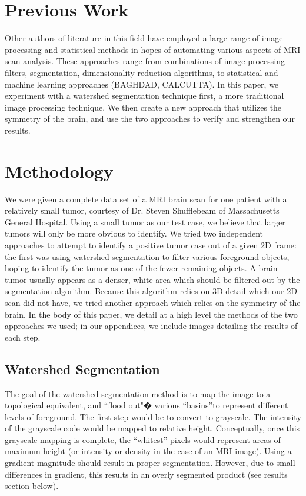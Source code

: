 \documentclass[12pt]{article}
\theoremstyle{plain}%
\theoremstyle{definition}
\theoremstyle{remark}
\begin{document}
\section{Previous Work}
Other authors of literature in this field have employed a large range of image processing and statistical methods in hopes of automating various aspects of MRI scan analysis. These approaches range from combinations of image processing filters, segmentation, dimensionality reduction algorithms, to statistical and machine learning approaches (BAGHDAD, CALCUTTA). In this paper, we experiment with a watershed segmentation technique first, a more traditional image processing technique. We then create a new approach that utilizes the symmetry of the brain, and use the two approaches to verify and strengthen our results.

\section{Methodology}

We were given a complete data set of a MRI brain scan for one patient with a relatively small tumor, courtesy of Dr. Steven Shufflebeam of Massachusetts General Hospital.  Using a small tumor as our test case, we believe that larger tumors will only be more obvious to identify. We tried two independent approaches to attempt to identify a positive tumor case out of a given 2D frame: the first was using watershed segmentation to filter various foreground objects, hoping to identify the tumor as one of the fewer remaining objects.  A brain tumor usually appears as a denser, white area which should be filtered out by the segmentation algorithm.  Because this algorithm relies on 3D detail which our 2D scan did not have, we tried another approach which relies on the symmetry of the brain. In the body of this paper, we detail at a high level the methods of the two approaches we used; in our appendices, we include images detailing the results of each step.

\subsection{Watershed Segmentation}

The goal of the watershed segmentation method is to map the image to a topological equivalent, and ``flood out"� various ``basins''to represent different levels of foreground.  The first step would be to convert to grayscale.  The intensity of the grayscale code would be mapped to relative height.  Conceptually, once this grayscale mapping is complete, the “whitest” pixels would represent areas of maximum height (or intensity or density in the case of an MRI image).  Using a gradient magnitude should result in proper segmentation.  However, due to small differences in gradient, this results in an overly segmented product (see results section below).
\end{document}

